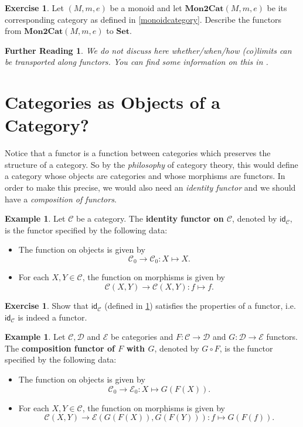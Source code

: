\documentclass[a4paper,11pt, oneside,titlepage=false]{scrbook}
\theoremstyle{plain}
\newtheorem*{reading*}{Further Reading}
\theoremstyle{definition}
\newtheorem{exa}[thm]{Example}
\newtheorem{exer}[thm]{Exercise}
\newcommand{\cfont}[1]{\ensuremath{\mathsf{#1}}}
\newcommand{\Cat}[1]{\mathcal{#1}}
\newcommand{\CC}{\Cat{C}}
\newcommand{\DD}{\Cat{D}}
\newcommand{\EE}{\Cat{E}}
\newcommand{\Catb}[1]{\mathbf{#1}}
\newcommand{\SET}{\Catb{Set}}
\newcommand{\MONtoCAT}{\Catb{Mon2Cat}}
\newcommand{\Ob}[1]{{#1}_0}
\newcommand{\CHom}[3]{{#1}(#2,#3)}
\newcommand{\Id}[1][]{\cfont{id}_{#1}}
\newcommand{\co}[2]{\ensuremath{#2 \circ #1}}
\begin{document}
\begin{exer}\label{ex:monoid_functors}
  Let $(M,m,e)$ be a monoid and let $\MONtoCAT(M,m,e)$ be its corresponding category as defined in \cref{monoidcategory}.
  Describe the functors from $\MONtoCAT(M,m,e)$ to $\SET$.
\end{exer}


\begin{reading*}
  We do not discuss here whether/when/how (co)limits can be transported along functors.
  You can find some information on this in \cite[\S 5.3]{leinster}.
\end{reading*}


\section{Categories as Objects of a Category?}
Notice that a functor is a function between categories which preserves the structure of a category. So by the \textit{philosophy} of category theory, this would define a category whose objects are categories and whose morphisms are functors. In order to make this precise, we would also need an \textit{identity functor} and we should have a \textit{composition of functors}.

\begin{exa}\label{example:functor_id} Let $\CC$ be a category. The \textbf{identity functor on $\CC$}, denoted by $\Id[\CC]$, is the functor specified by the following data:
\begin{itemize}
\item The function on objects is given by
\[
\Ob{\CC}\to \Ob{\CC}: X\mapsto X.
\]
\item For each $X,Y\in\CC$, the function on morphisms is given by
\[
\CHom \CC X Y\to \CHom \CC X Y: f\mapsto f.
\]
\end{itemize}
\end{exa}

\begin{exer} Show that $\Id[\CC]$ (defined in \cref{example:functor_id}) satisfies the properties of a functor, i.e. $\Id[\CC]$ is indeed a functor.
\end{exer}

\begin{exa}\label{example:functor_comp} Let $\CC,\DD$ and $\EE$ be  categories and $F:\CC\to\DD$ and $G:\DD\to\EE$ functors. The \textbf{composition functor of $F$ with $G$}, denoted by $\co{F}{G}$, is the functor specified by the following data:
\begin{itemize}
\item The function on objects is given by
\[
\Ob{\CC}\to \Ob{\EE}: X\mapsto G(F(X)).
\]
\item For each $X,Y\in\CC$, the function on morphisms is given by
\[
\CHom \CC X Y\to \CHom{\EE}{G(F(X))}{G(F(Y))}: f\mapsto G(F(f)).
\]
\end{itemize}
\end{exa}
\end{document}
